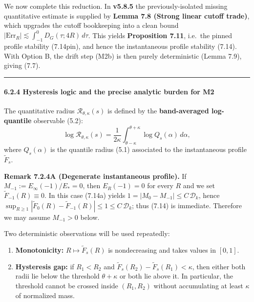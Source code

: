 \documentclass[
  11pt,
]{article}
\providecommand{\tightlist}{%
  \setlength{\itemsep}{0pt}\setlength{\parskip}{0pt}}
\begin{document}
We now complete this reduction. In \textbf{v5.8.5} the previously-isolated missing quantitative estimate is supplied by \textbf{Lemma 7.8 (Strong linear cutoff trade)}, which upgrades the cutoff bookkeeping into a clean bound \(|\mathrm{Err}_R|\lesssim \int_{-1}^0 D_G(\tau;4R)\,d\tau\). This yields \textbf{Proposition 7.11}, i.e.~the pinned profile stability (7.14pin), and hence the instantaneous profile stability (7.14). With Option B, the drift step (M2b) is then purely deterministic (Lemma 7.9), giving (7.7).

\begin{center}\rule{0.5\linewidth}{0.5pt}\end{center}

\hypertarget{hysteresis-logic-and-the-precise-analytic-burden-for-m2}{%
\paragraph{6.2.4 Hysteresis logic and the precise analytic burden for M2}\label{hysteresis-logic-and-the-precise-analytic-burden-for-m2}}

The quantitative radius \(\mathcal R_{\theta,\kappa}(s)\) is defined by the \textbf{band-averaged log-quantile} observable (5.2): \[
\log \mathcal R_{\theta,\kappa}(s)=\frac{1}{2\kappa}\int_{\theta-\kappa}^{\theta+\kappa}\log Q_s(\alpha)\,d\alpha,
\] where \(Q_s(\alpha)\) is the quantile radius (5.1) associated to the instantaneous profile \(\widetilde F_s\).

\textbf{Remark 7.2.4A (Degenerate instantaneous profile).} If \(M_{-1}:=E_\infty(-1)/E_* = 0\), then \(E_R(-1)=0\) for every \(R\) and we set \(\widetilde F_{-1}(R)\equiv 0\). In this case (7.14a) yields \(1=|M_0-M_{-1}|\le C\,\mathcal D_k\), hence \(\sup_{R\ge1}|\widetilde F_0(R)-\widetilde F_{-1}(R)|\le 1\le C\,\mathcal D_k\); thus (7.14) is immediate. Therefore we may assume \(M_{-1}>0\) below.

Two deterministic observations will be used repeatedly:

\begin{enumerate}
\def\labelenumi{\arabic{enumi}.}
\tightlist
\item
  \textbf{Monotonicity:} \(R\mapsto \widetilde F_s(R)\) is nondecreasing and takes values in \([0,1]\).
\item
  \textbf{Hysteresis gap:} if \(R_1<R_2\) and \(\widetilde F_s(R_2)-\widetilde F_s(R_1)<\kappa\), then either both radii lie below the threshold \(\theta+\kappa\) or both lie above it. In particular, the threshold cannot be crossed inside \((R_1,R_2)\) without accumulating at least \(\kappa\) of normalized mass.
\end{enumerate}
\end{document}
